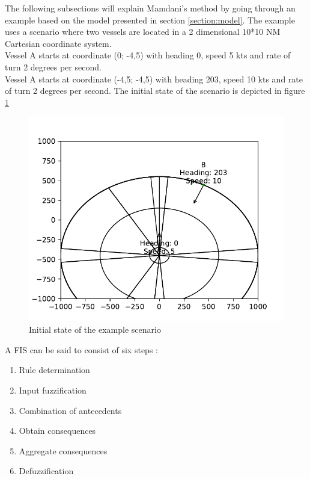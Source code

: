 The following subsections will explain Mamdani's method by going through an example based on the model presented in section \ref{section:model}. The example uses a scenario where two vessels are located in a 2 dimensional 10*10 NM Cartesian coordinate system.\\
Vessel A starts at coordinate (0; -4,5) with heading 0, speed 5 kts and rate of turn 2 degrees per second.\\
Vessel A starts at coordinate (-4,5; -4,5) with heading 203, speed 10 kts and rate of turn 2 degrees per second.
The initial state of the scenario is depicted in figure \ref{fig:scenario_1a}
\begin{figure}[H]
    \centering
    \includegraphics[width=\textwidth]{Figures/scenario_1a}
    \caption{Initial state of the example scenario}
    \label{fig:scenario_1a}
\end{figure}


A FIS can be said to consist of six steps \cite{fis_princeston}:
\begin{enumerate}
    \item Rule determination
    \item Input fuzzification
    \item Combination of antecedents
    \item Obtain consequences
    \item Aggregate consequences
    \item Defuzzification
\end{enumerate}

